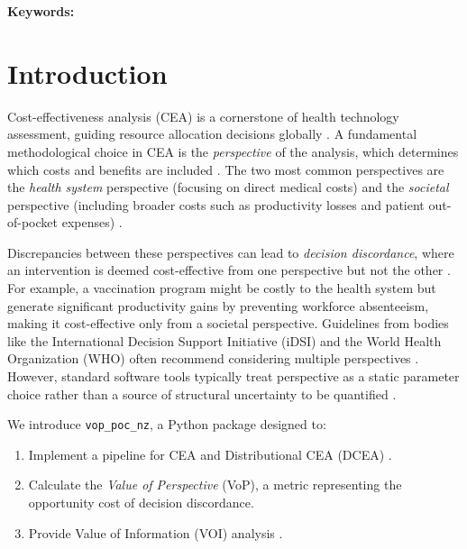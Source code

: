 \documentclass{article}
\author{Dylan A. Mordaunt\\Victoria University of Wellington}
\newcommand{\pkg}[1]{\texttt{#1}}
\newcommand{\myabstract}{}
\newcommand{\mykeywords}{}
\begin{document}
\maketitle
\begin{abstract}
\myabstract
\end{abstract}
\noindent\textbf{Keywords:} \mykeywords

\section{Introduction} \label{sec:intro}

Cost-effectiveness analysis (CEA) is a cornerstone of health technology assessment, guiding resource allocation decisions globally \citep{drummond2015}.
A fundamental methodological choice in CEA is the \emph{perspective} of the analysis, which determines which costs and benefits are included \citep{sanders2016}.
The two most common perspectives are the \emph{health system} perspective (focusing on direct medical costs) and the \emph{societal} perspective (including broader costs such as productivity losses and patient out-of-pocket expenses) \citep{drummond2015}.

Discrepancies between these perspectives can lead to \emph{decision discordance}, where an intervention is deemed cost-effective from one perspective but not the other \citep{claxton2010}.
For example, a vaccination program might be costly to the health system but generate significant productivity gains by preventing workforce absenteeism, making it cost-effective only from a societal perspective.
Guidelines from bodies like the International Decision Support Initiative (iDSI) and the World Health Organization (WHO) often recommend considering multiple perspectives \citep{wilkinson2016, tan-torres2003}. However, standard software tools typically treat perspective as a static parameter choice rather than a source of structural uncertainty to be quantified \citep{alarid2024, filipovic2017}.

We introduce \pkg{vop\_poc\_nz}, a Python package designed to:
\begin{enumerate}
  \item Implement a pipeline for CEA and Distributional CEA (DCEA) \citep{cookson2017}.
  \item Calculate the \emph{Value of Perspective} (VoP), a metric representing the opportunity cost of decision discordance.
  \item Provide Value of Information (VOI) analysis \citep{claxton2001}.
\end{enumerate}
\end{document}
